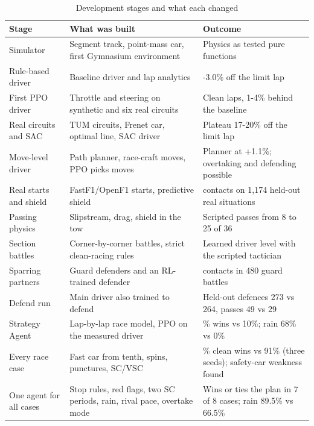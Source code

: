 \documentclass{ieeeaccess}
\begin{document}
\begin{table}[!t]
\caption{Development stages and what each changed}
\label{tab:5}
\centering\footnotesize
\begin{tabularx}{\textwidth}{>{\raggedright\arraybackslash}X>{\raggedright\arraybackslash}X>{\raggedright\arraybackslash}X}
\hline
\textbf{Stage} & \textbf{What was built} & \textbf{Outcome} \\
\hline
Simulator & Segment track, point-mass car, first Gymnasium environment & Physics as tested pure functions \\
Rule-based driver & Baseline driver and lap analytics & 2.3-3.0\% off the limit lap \\
First PPO driver & Throttle and steering on synthetic and six real circuits & Clean laps, 1-4\% behind the baseline \\
Real circuits and SAC & 25 TUM circuits, Frenet car, optimal line, SAC driver & Plateau 17-20\% off the limit lap \\
Move-level driver & Path planner, race-craft moves, PPO picks moves & Planner at +1.1\%; overtaking and defending possible \\
Real starts and shield & FastF1/OpenF1 starts, predictive shield & 0 contacts on 1,174 held-out real situations \\
Passing physics & Slipstream, drag, shield in the tow & Scripted passes from 8 to 25 of 36 \\
Section battles & Corner-by-corner battles, strict clean-racing rules & Learned driver level with the scripted tactician \\
Sparring partners & Guard defenders and an RL-trained defender & 0 contacts in 480 guard battles \\
Defend run & Main driver also trained to defend & Held-out defences 273 vs 264, passes 49 vs 29 \\
Strategy Agent & Lap-by-lap race model, PPO on the measured driver & 72\% wins vs 10\%; rain 68\% vs 0\% \\
Every race case & Fast car from tenth, spins, punctures, SC/VSC & 96.7\% clean wins vs 91\% (three seeds); safety-car weakness found \\
One agent for all cases & Stop rules, red flags, two SC periods, rain, rival pace, overtake mode & Wins or ties the plan in 7 of 8 cases; rain 89.5\% vs 66.5\% \\
\hline
\end{tabularx}
\end{table}
\end{document}

